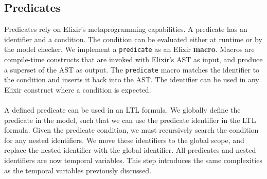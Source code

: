 \subsection{Predicates}
Predicates rely on Elixir's metaprogramming capabilities. A predicate has an identifier and a condition. The condition can be evaluated either at runtime or by the model checker. We implement a \texttt{predicate} as an Elixir \textbf{macro}. Macros are compile-time constructs that are invoked with Elixir's AST as input, and produce a superset of the AST as output. The \texttt{predicate} macro matches the identifier to the condition and inserts it back into the AST. The identifier can be used in any Elixir construct where a condition is expected.
\\ \\
A defined predicate can be used in an LTL formula. We globally define the predicate in the model, such that we can use the predicate identifier in the LTL formula. Given the predicate condition, we must recursively search the condition for any nested identifiers. We move these identifiers to the global scope, and replace the nested identifier with the global identifier. All predicates and nested identifiers are now temporal variables. This step introduces the same complexities as the temporal variables previously discussed.
